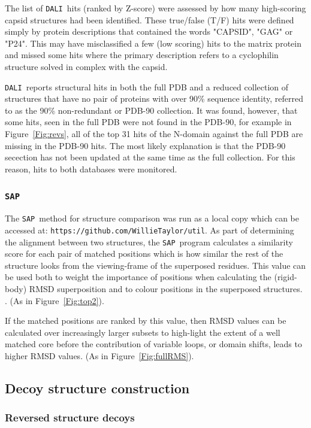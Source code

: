 \documentclass[preprint,12pt]{elsarticle}
\newcommand{\SAP}{{\tt SAP}}
\newcommand{\DALI}{{\tt DALI}}
\newcommand{\Fig}[1]{Figure~\ref{Fig:#1}}
\begin{document}
The list of \DALI\ hits (ranked by Z-score) were assessed by how many high-scoring capsid structures had
been identified.    These true/false (T/F) hits were defined simply by protein descriptions that contained the
words "CAPSID", "GAG" or "P24".   This may have misclassified a few (low scoring) hits to the matrix protein
and missed some hits where the primary description refers to a cyclophilin structure solved in complex
with the capsid.

\DALI\ reports structural hits in both the full PDB and a reduced collection of structures that
have no pair of proteins with over 90\% sequence identity, referred to as the 90\% non-redundant or PDB-90 collection.
It was found, however, that some hits, seen in the full PDB were not found in the PDB-90, for example in \Fig{revs},
all of the top 31 hits of the N-domain against the full PDB are missing in the PDB-90 hits.
The most likely explanation is that the PDB-90 secection has not been updated at the same time
as the full collection.    For this reason, hits to both databases were monitored.

\subsubsection{\SAP}

The \SAP\ method for structure comparison \cite{TaylorWR99a} was run as a local copy which can
be accessed at: {\tt https://github.com/WillieTaylor/util}.  
As part of determining the alignment between two structures,
the \SAP\ program calculates a similarity score for each pair of matched positions which is
how similar the rest of the structure looks from the viewing-frame of the superposed residues.
This value can be used both to weight the importance of positions when calculating the
(rigid-body) RMSD superposition and to colour positions in the superposed structures.
\cite{RippmannFet91a}. (As in \Fig{top2}).

If the matched positions are ranked by this value, then RMSD values can be calculated over
increasingly larger subsets to high-light the extent of a well matched core before
the contribution of variable loops, or domain shifts, leads to higher RMSD values.
(As in \Fig{fullRMS}).

\subsection{Decoy structure construction}

\subsubsection{Reversed structure decoys}
\end{document}
